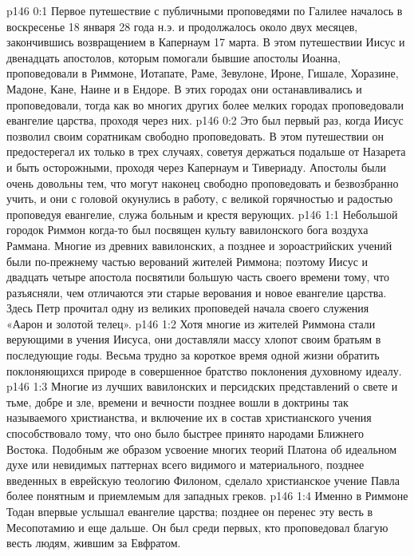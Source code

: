 \author{Комиссия срединников}
\vs p146 0:1 Первое путешествие с публичными проповедями по Галилее началось в воскресенье 18 января 28 года н.э. и продолжалось около двух месяцев, закончившись возвращением в Капернаум 17 марта. В этом путешествии Иисус и двенадцать апостолов, которым помогали бывшие апостолы Иоанна, проповедовали в Риммоне, Иотапате, Раме, Зевулоне, Ироне, Гишале, Хоразине, Мадоне, Кане, Наине и в Ендоре. В этих городах они останавливались и проповедовали, тогда как во многих других более мелких городах проповедовали евангелие царства, проходя через них.
\vs p146 0:2 Это был первый раз, когда Иисус позволил своим соратникам свободно проповедовать. В этом путешествии он предостерегал их только в трех случаях, советуя держаться подальше от Назарета и быть осторожными, проходя через Капернаум и Тивериаду. Апостолы были очень довольны тем, что могут наконец свободно проповедовать и безвозбранно учить, и они с головой окунулись в работу, с великой горячностью и радостью проповедуя евангелие, служа больным и крестя верующих.
\vs p146 1:1 Небольшой городок Риммон когда\hyp{}то был посвящен культу вавилонского бога воздуха Раммана. Многие из древних вавилонских, а позднее и зороастрийских учений были по\hyp{}прежнему частью верований жителей Риммона; поэтому Иисус и двадцать четыре апостола посвятили большую часть своего времени тому, что разъясняли, чем отличаются эти старые верования и новое евангелие царства. Здесь Петр прочитал одну из великих проповедей начала своего служения «Аарон и золотой телец».
\vs p146 1:2 Хотя многие из жителей Риммона стали верующими в учения Иисуса, они доставляли массу хлопот своим братьям в последующие годы. Весьма трудно за короткое время одной жизни обратить поклоняющихся природе в совершенное братство поклонения духовному идеалу.
\vs p146 1:3 \pc Многие из лучших вавилонских и персидских представлений о свете и тьме, добре и зле, времени и вечности позднее вошли в доктрины так называемого христианства, и включение их в состав христианского учения способствовало тому, что оно было быстрее принято народами Ближнего Востока. Подобным же образом усвоение многих теорий Платона об идеальном духе или невидимых паттернах всего видимого и материального, позднее введенных в еврейскую теологию Филоном, сделало христианское учение Павла более понятным и приемлемым для западных греков.
\vs p146 1:4 \pc Именно в Риммоне Тодан впервые услышал евангелие царства; позднее он перенес эту весть в Месопотамию и еще дальше. Он был среди первых, кто проповедовал благую весть людям, жившим за Евфратом.
